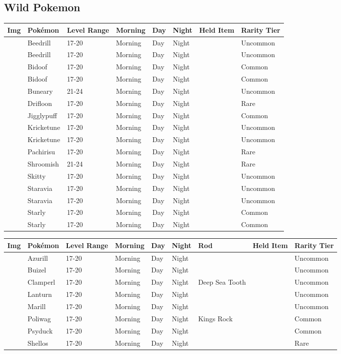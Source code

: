 \subsection{Wild Pokemon}%
\label{subsec:WildPokemon}%
\begin{longtable}{||l l l l l l l l||}%
\hline%
Img&Pokémon&Level Range&Morning&Day&Night&Held Item&Rarity Tier\\%
\hline%
\endhead%
\hline%
&Beedrill&17{-}20&Morning&Day&Night&&Uncommon\\%
\hline%
&Beedrill&17{-}20&Morning&Day&Night&&Uncommon\\%
\hline%
&Bidoof&17{-}20&Morning&Day&Night&&Common\\%
\hline%
&Bidoof&17{-}20&Morning&Day&Night&&Common\\%
\hline%
&Buneary&21{-}24&Morning&Day&Night&&Uncommon\\%
\hline%
&Drifloon&17{-}20&Morning&Day&Night&&Rare\\%
\hline%
&Jigglypuff&17{-}20&Morning&Day&Night&&Common\\%
\hline%
&Kricketune&17{-}20&Morning&Day&Night&&Uncommon\\%
\hline%
&Kricketune&17{-}20&Morning&Day&Night&&Uncommon\\%
\hline%
&Pachirisu&17{-}20&Morning&Day&Night&&Rare\\%
\hline%
&Shroomish&21{-}24&Morning&Day&Night&&Rare\\%
\hline%
&Skitty&17{-}20&Morning&Day&Night&&Uncommon\\%
\hline%
&Staravia&17{-}20&Morning&Day&Night&&Uncommon\\%
\hline%
&Staravia&17{-}20&Morning&Day&Night&&Uncommon\\%
\hline%
&Starly&17{-}20&Morning&Day&Night&&Common\\%
\hline%
&Starly&17{-}20&Morning&Day&Night&&Common\\%
\hline%
\end{longtable}%
\begin{longtable}{||l l l l l l l l l||}%
\hline%
Img&Pokémon&Level Range&Morning&Day&Night&Rod&Held Item&Rarity Tier\\%
\hline%
\endhead%
\hline%
&Azurill&17{-}20&Morning&Day&Night&&&Uncommon\\%
\hline%
&Buizel&17{-}20&Morning&Day&Night&&&Uncommon\\%
\hline%
&Clamperl&17{-}20&Morning&Day&Night&Deep Sea Tooth&&Uncommon\\%
\hline%
&Lanturn&17{-}20&Morning&Day&Night&&&Uncommon\\%
\hline%
&Marill&17{-}20&Morning&Day&Night&&&Uncommon\\%
\hline%
&Poliwag&17{-}20&Morning&Day&Night&Kings Rock&&Common\\%
\hline%
&Psyduck&17{-}20&Morning&Day&Night&&&Common\\%
\hline%
&Shellos&17{-}20&Morning&Day&Night&&&Rare\\%
\hline%
\end{longtable}